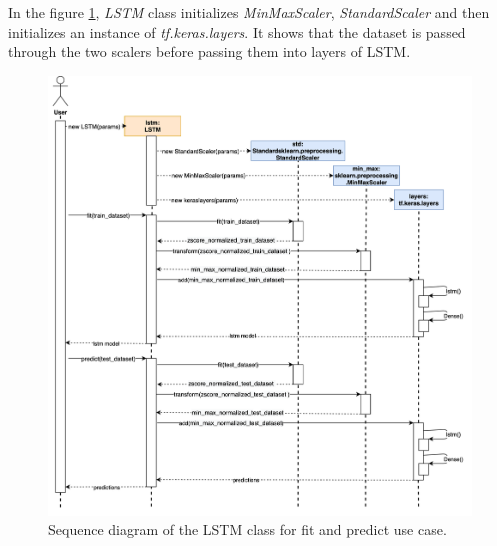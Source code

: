 In the figure \ref{fig:rul_seq_lstm}, \textit{LSTM} class initializes \textit{MinMaxScaler}, \textit{StandardScaler} and then initializes an instance of \textit{tf.keras.layers}. It shows that the dataset is passed through the two scalers before passing them into layers of LSTM.
\begin{figure}[H]
    \centering
    \includegraphics[width=\textwidth]{gfx/rul_seq_lstm}
    \caption{Sequence diagram of the LSTM class for fit and predict use case.}
    \label{fig:rul_seq_lstm}
\end{figure}